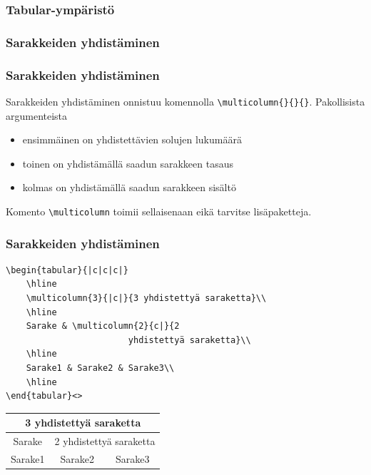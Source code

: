 \begin{frame}[fragile]
    \frametitle{Tabular-ympäristö}
    
    
\end{frame}

\subsubsection{Sarakkeiden yhdistäminen}
\begin{frame}[fragile]
    \frametitle{Sarakkeiden yhdistäminen}
    Sarakkeiden yhdistäminen onnistuu komennolla \lstinline-\multicolumn{}{}{}-. Pakollisista argumenteista
    \begin{itemize}
        \item ensimmäinen on yhdistettävien solujen lukumäärä
        \item toinen on yhdistämällä saadun sarakkeen tasaus
        \item kolmas on yhdistämällä saadun sarakkeen sisältö
    \end{itemize}
    Komento \lstinline-\multicolumn- toimii sellaisenaan eikä tarvitse lisäpaketteja.
\end{frame}

\begin{frame}[fragile]
    \frametitle{Sarakkeiden yhdistäminen}
    \begin{lstlisting}
\begin{tabular}{|c|c|c|}
    \hline
    \multicolumn{3}{|c|}{3 yhdistettyä saraketta}\\
    \hline
    Sarake & \multicolumn{2}{c|}{2
                        yhdistettyä saraketta}\\
    \hline
    Sarake1 & Sarake2 & Sarake3\\
    \hline
\end{tabular}<>
    \end{lstlisting}
    \begin{serif}
        \begin{small}
            \begin{tabular}{|c|c|c|}
                \hline
                \multicolumn{3}{|c|}{3 yhdistettyä saraketta}\\
                \hline
                Sarake & \multicolumn{2}{c|}{2 yhdistettyä saraketta}\\
                \hline
                Sarake1 & Sarake2 & Sarake3\\
                \hline
            \end{tabular}
        \end{small}
    \end{serif}
\end{frame}

